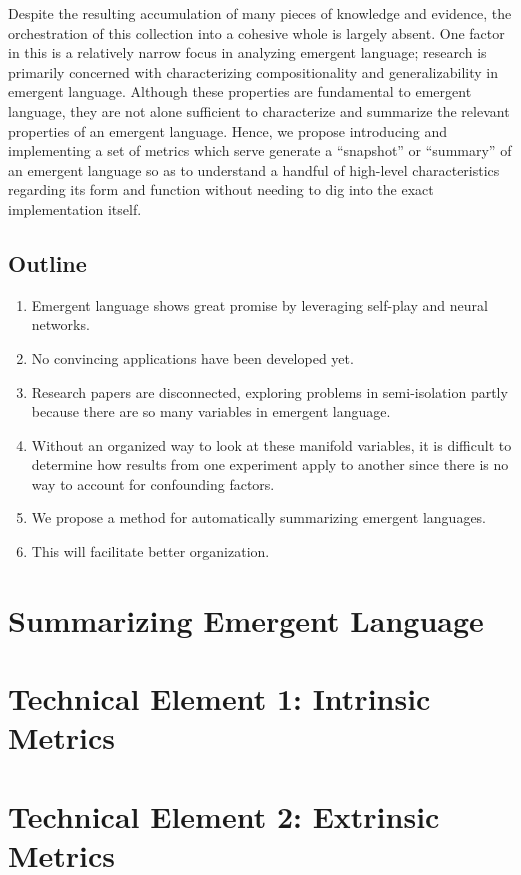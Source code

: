 
Despite the resulting accumulation of many pieces of knowledge and evidence, the orchestration of this collection into a cohesive whole is largely absent.
One factor in this is a relatively narrow focus in analyzing emergent language; research is primarily concerned with characterizing compositionality and generalizability in emergent language.
Although these properties are fundamental to emergent language, they are not alone sufficient to characterize and summarize the relevant properties of an emergent language.
Hence, we propose introducing and implementing a set of metrics which serve generate a ``snapshot'' or ``summary'' of an emergent language so as to understand a handful of high-level characteristics regarding its form and function without needing to dig into the exact implementation itself.


\subsection*{Outline}

\begin{enumerate}
    \item Emergent language shows great promise by leveraging self-play and neural networks.
    \item No convincing applications have been developed yet.
    \item Research papers are disconnected, exploring problems in semi-isolation partly because there are so many variables in emergent language.
    \item Without an organized way to look at these manifold variables, it is difficult to determine how results from one experiment apply to another since there is no way to account for confounding factors.
    \item We propose a method for automatically summarizing emergent languages.
    \item This will facilitate better organization.
\end{enumerate}

\section{Summarizing Emergent Language}

\section{Technical Element 1: Intrinsic Metrics}
\section{Technical Element 2: Extrinsic Metrics}
